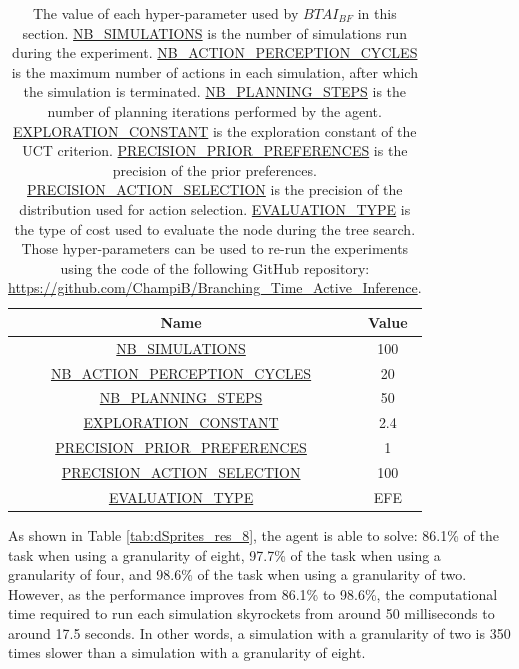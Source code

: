 \documentclass[twoside,11pt]{article}
\begin{document}
\begin{table}[H]
\centering
\begin{tabular}{ |c|c|  }
 \hline
 Name & Value\\
 \hline
 \hline
 \url{NB_SIMULATIONS} & 100\\
 \hline
 \url{NB_ACTION_PERCEPTION_CYCLES} & 20\\
 \hline
 \url{NB_PLANNING_STEPS} & 50\\
 \hline
 \url{EXPLORATION_CONSTANT} & 2.4\\
 \hline
 \url{PRECISION_PRIOR_PREFERENCES} & 1\\
 \hline
 \url{PRECISION_ACTION_SELECTION} & 100\\
 \hline
 \url{EVALUATION_TYPE} & EFE\\
 \hline
\end{tabular}
\caption{The value of each hyper-parameter used by $BTAI_{BF}$ in this section. \url{NB_SIMULATIONS} is the number of simulations run during the experiment. \url{NB_ACTION_PERCEPTION_CYCLES} is the maximum number of actions in each simulation, after which the simulation is terminated. \url{NB_PLANNING_STEPS} is the number of planning iterations performed by the agent. \url{EXPLORATION_CONSTANT} is the exploration constant of the UCT criterion. \url{PRECISION_PRIOR_PREFERENCES} is the precision of the prior preferences. \url{PRECISION_ACTION_SELECTION} is the precision of the distribution used for action selection. \url{EVALUATION_TYPE} is the type of cost used to evaluate the node during the tree search. Those hyper-parameters can be used to re-run the experiments using the code of the following GitHub repository: \url{https://github.com/ChampiB/Branching_Time_Active_Inference}.}
\label{tab:values_hp_BTAI_BF_dSprites}
\end{table}

As shown in Table \ref{tab:dSprites_res_8}, the agent is able to solve: 86.1\% of the task when using a granularity of eight, 97.7\% of the task when using a granularity of four, and 98.6\% of the task when using a granularity of two. However, as the performance improves from 86.1\% to 98.6\%, the computational time required to run each simulation skyrockets from around 50 milliseconds to around 17.5 seconds. In other words, a simulation with a granularity of two is 350 times slower than a simulation with a granularity of eight.
\end{document}
